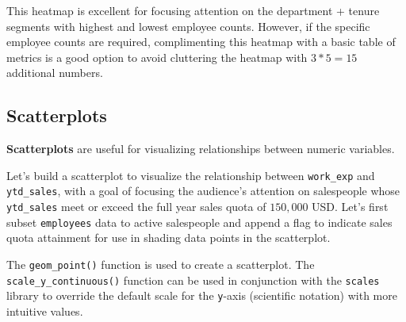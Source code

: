 \documentclass[
]{book}
\newenvironment{Shaded}{\begin{snugshade}}{\end{snugshade}}
\newcommand{\CommentTok}[1]{\textcolor[rgb]{0.56,0.35,0.01}{\textit{#1}}}
\newcommand{\DecValTok}[1]{\textcolor[rgb]{0.00,0.00,0.81}{#1}}
\newcommand{\FunctionTok}[1]{\textcolor[rgb]{0.00,0.00,0.00}{#1}}
\newcommand{\NormalTok}[1]{#1}
\newcommand{\OtherTok}[1]{\textcolor[rgb]{0.56,0.35,0.01}{#1}}
\newcommand{\SpecialCharTok}[1]{\textcolor[rgb]{0.00,0.00,0.00}{#1}}
\newcommand{\StringTok}[1]{\textcolor[rgb]{0.31,0.60,0.02}{#1}}
\begin{document}
This heatmap is excellent for focusing attention on the department + tenure segments with highest and lowest employee counts. However, if the specific employee counts are required, complimenting this heatmap with a basic table of metrics is a good option to avoid cluttering the heatmap with \(3*5 = 15\) additional numbers.

\hypertarget{scatterplots}{%
\subsection{Scatterplots}\label{scatterplots}}

\textbf{Scatterplots} are useful for visualizing relationships between numeric variables.

Let's build a scatterplot to visualize the relationship between \texttt{work\_exp} and \texttt{ytd\_sales}, with a goal of focusing the audience's attention on salespeople whose \texttt{ytd\_sales} meet or exceed the full year sales quota of \(150,000\) USD. Let's first subset \texttt{employees} data to active salespeople and append a flag to indicate sales quota attainment for use in shading data points in the scatterplot.

\begin{Shaded}
\end{Shaded}

The \texttt{geom\_point()} function is used to create a scatterplot. The \texttt{scale\_y\_continuous()} function can be used in conjunction with the \texttt{scales} library to override the default scale for the \texttt{y}-axis (scientific notation) with more intuitive values.
\end{document}
